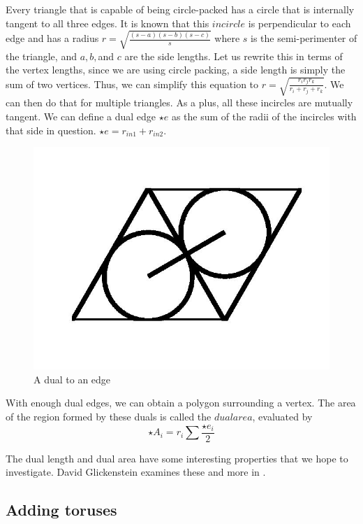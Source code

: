 \documentclass[12pt]{article}
\begin{document}
Every triangle that is capable of being circle-packed has a circle that is internally tangent to all three edges. It is known that this $incircle$ is perpendicular to each edge and has a radius $\displaystyle r = \sqrt{\frac{(s-a)(s-b)(s-c)}{s}}$ where $s$ is the semi-perimenter of the triangle, and $a, b, $and $c$ are the side lengths. Let us rewrite this in terms of the vertex lengths, since we are using circle packing, a side length is simply the sum of two vertices. Thus, we can simplify this equation to $\displaystyle r = \sqrt{\frac{r_i r_j r_k}{r_i + r_j + r_k}}.$ We can then do that for multiple triangles. As a plus, all these incircles are mutually tangent. We can define a dual edge $\star e$ as the sum of the radii of the incircles with that side in question. $\star e = r_{in1} + r_{in2}$.\newline

\begin{figure}
\centering
\label{dual}
\includegraphics[scale = 0.4]{dual.jpg}
\caption{A dual to an edge}
\end{figure}

\noindent With enough dual edges, we can obtain a polygon surrounding a vertex. The area of the region formed by these duals is called the $dual area$, evaluated by $$\star A_i = r_i\sum{\frac{\star e_i}{2}}$$

\noindent The dual length and dual area have some interesting properties that we hope to investigate. David Glickenstein examines these and more in \cite{Dave}.  

\subsection{Adding toruses}
\maketitle
\end{document}
